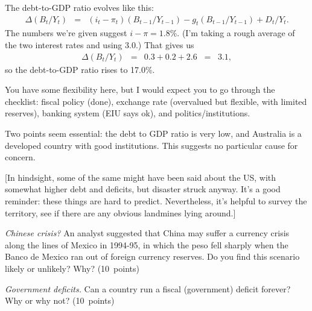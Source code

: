 \documentclass[letterpaper,12pt]{exam}
\begin{document}
\begin{questions}
\begin{solution}
\begin{parts}
\item The debt-to-GDP ratio evolves like this:
\begin{eqnarray*}
   \Delta (B_t/Y_t)  &=&  (i_t - \pi_t)(B_{t-1}/Y_{t-1})
                - g_t (B_{t-1}/Y_{t-1}) + D_t/Y_t .
\end{eqnarray*}
The numbers we're given suggest
$i-\pi = 1.8\%$.
(I'm taking a rough average of the two interest rates and using 3.0.)
That gives us
\begin{eqnarray*}
   \Delta (B_t/Y_t)  &=&  0.3 + 0.2 + 2.6
            \;\;=\;\; 3.1,
\end{eqnarray*}
so the debt-to-GDP ratio rises to 17.0\%.

\item You have some flexibility here, but I would expect you to
go through the checklist:
fiscal policy (done),
exchange rate (overvalued but flexible, with limited reserves),
banking system (EIU says ok), and politics/institutions.

Two points seem essential:
the debt to GDP ratio is very low,
and Australia  is a developed country with good institutions.
This suggests  no particular cause for concern.

[In hindsight, some of the same might have been said about the US,
with somewhat higher debt and deficits,
but disaster struck anyway.
It's a good reminder:  these things are hard to predict.
Nevertheless, it's helpful to survey the territory,
see if there are any obvious landmines lying around.]

\end{parts}
\end{solution}


\begin{parts}
\item {\it Chinese crisis?\/}
An analyst suggested that China may suffer a currency crisis
along the lines of Mexico in 1994-95,
in which the peso fell sharply when the Banco de Mexico
ran out of foreign currency reserves.
Do you find this scenario likely or unlikely?  Why?
 (10~points)

\item {\it Government deficits.\/}
Can a country run a fiscal (government) deficit forever?
Why or why not?
 (10~points)



\end{parts}
\end{questions}
\end{document}
